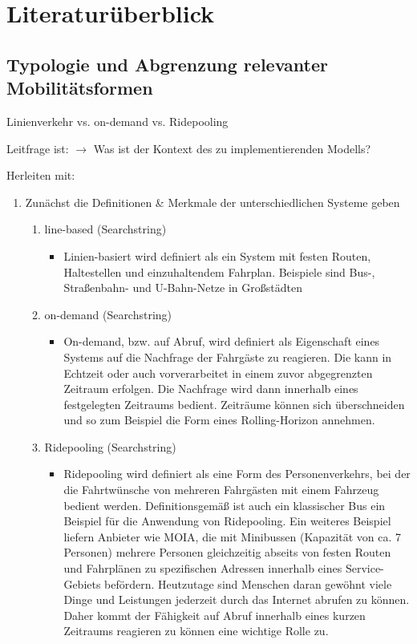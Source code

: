 \chapter{Literaturüberblick}
\label{chapter:2}
\section{Typologie und Abgrenzung relevanter Mobilitätsformen}
\label{sec:2.1}
\label{sec:LinienverkehrVsOnDemandVsRidepooling}

Linienverkehr vs. on-demand vs. Ridepooling

Leitfrage ist: $\rightarrow$ Was ist der Kontext des zu implementierenden Modells?

Herleiten mit:
\begin{enumerate}
    \item Zunächst die Definitionen \& Merkmale der unterschiedlichen Systeme geben
    \begin{enumerate}
        \item line-based (Searchstring)
        \begin{itemize}
            \item Linien-basiert  wird definiert als ein System mit festen Routen, Haltestellen und einzuhaltendem Fahrplan. Beispiele sind Bus-, Straßenbahn- und U-Bahn-Netze in Großstädten
        \end{itemize}
        \item on-demand (Searchstring)
        \begin{itemize}
            \item On-demand, bzw. auf Abruf, wird definiert als Eigenschaft eines Systems auf die Nachfrage der Fahrgäste zu reagieren. Die kann in Echtzeit oder auch vorverarbeitet in einem zuvor abgegrenzten Zeitraum erfolgen. Die Nachfrage wird dann innerhalb eines festgelegten Zeitraums bedient. Zeiträume können sich überschneiden und so zum Beispiel die Form eines Rolling-Horizon annehmen.
        \end{itemize}
        \item Ridepooling (Searchstring)
        \begin{itemize}
            \item Ridepooling wird definiert als eine Form des Personenverkehrs, bei der die Fahrtwünsche von mehreren Fahrgästen mit einem Fahrzeug bedient werden. Definitionsgemäß ist auch ein klassischer Bus ein Beispiel für die Anwendung von Ridepooling. Ein weiteres Beispiel liefern Anbieter wie MOIA, die mit Minibussen (Kapazität von ca. 7 Personen) mehrere Personen gleichzeitig abseits von festen Routen und Fahrplänen zu spezifischen Adressen innerhalb eines Service-Gebiets befördern. Heutzutage sind Menschen daran gewöhnt viele Dinge und Leistungen jederzeit durch das Internet abrufen zu können. Daher kommt der Fähigkeit auf Abruf innerhalb eines kurzen Zeitraums reagieren zu können eine wichtige Rolle zu.
        \end{itemize}


\end{enumerate}
\end{enumerate}
